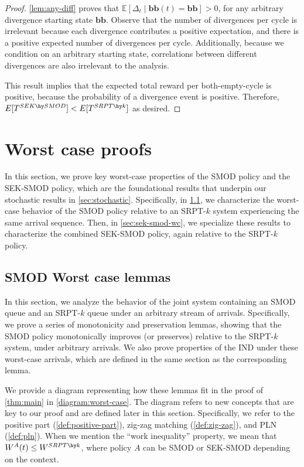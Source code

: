 \documentclass[acmsmall]{acmart}
\newcommand{\E}[1]{\mathbb{E}[#1]}
\newcommand{\bb}{\boldsymbol{b}}
\begin{document}
\begin{proof}
    \cref{lem:any-diff} proves that $\E{\Delta_t \mid \bb\bb(t) = \bb\bb} > 0$,
    for any arbitrary divergence starting state $\bb\bb$. Observe that the number of divergences per cycle is irrelevant because each divergence contributes a positive expectation, and there is a positive expected number of divergences per cycle. Additionally, because we condition on an arbitrary starting state, correlations between different divergences are also irrelevant to the analysis.
    
    This result implies that the expected total reward per both-empty-cycle is positive, because the probability of a divergence event is positive. Therefore, $E[T^{SEK \hy SMOD}] < E[T^{SRPT\hy k}]$ as desired.
\end{proof}

\section{Worst case proofs}
\label{sec:worst-case}

In this section, we prove key worst-case properties of the SMOD policy and the SEK-SMOD policy,
which are the foundational results that underpin our stochastic results in \cref{sec:stochastic}.
Specifically, in \cref{sec:smod-wc},
we characterize the worst-case behavior of the SMOD policy relative to an SRPT-$k$ system
experiencing the same arrival sequence.
Then, in \cref{sec:sek-smod-wc},
we specialize these results to characterize the combined SEK-SMOD policy,
again relative to the SRPT-$k$ policy.


\subsection{SMOD Worst case lemmas}
\label{sec:smod-wc}
In this section, we analyze the behavior of the joint system containing an SMOD queue and an SRPT-$k$ queue
under an arbitrary stream of arrivals.
Specifically, we prove a series of monotonicity and preservation lemmas,
showing that the SMOD policy monotonically improves (or preserves) relative to the SRPT-$k$ system, 
under arbitrary arrivals. We also prove properties of the IND under these worst-case arrivals, which are defined in the same section as the corresponding lemma. 

We provide a diagram representing how these lemmas fit in the proof of \cref{thm:main} in \cref{diagram:worst-case}. The diagram refers to new concepts that are key to our proof and are defined later in this section. Specifically, we refer to the positive part (\cref{def:positive-part}), zig-zag matching (\cref{def:zig-zag}), and PLN (\cref{def:pln}). When we mention the ``work inequality'' property, we mean that $W^A(t)\leq W^{SRPT\hy k}$, where policy $A$ can be SMOD or SEK-SMOD depending on the context.
\end{document}

